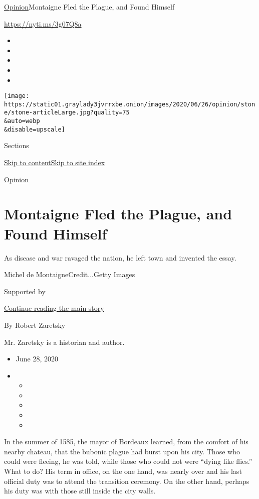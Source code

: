 \href{/section/opinion}{Opinion}\textbar{}Montaigne Fled the Plague, and
Found Himself

\url{https://nyti.ms/3g07Q8a}

\begin{itemize}
\item
\item
\item
\item
\item
\end{itemize}

\texttt{[image: https://static01.graylady3jvrrxbe.onion/images/2020/06/26/opinion/stone/stone-articleLarge.jpg?quality=75\\\&auto=webp\\\&disable=upscale]}

Sections

\protect\hyperlink{site-content}{Skip to
content}\protect\hyperlink{site-index}{Skip to site index}

\href{/section/opinion}{Opinion}

\hypertarget{montaigne-fled-the-plague-and-found-himself}{%
\section{Montaigne Fled the Plague, and Found
Himself}\label{montaigne-fled-the-plague-and-found-himself}}

As disease and war ravaged the nation, he left town and invented the
essay.

Michel de MontaigneCredit...Getty Images

Supported by

\protect\hyperlink{after-sponsor}{Continue reading the main story}

By Robert Zaretsky

Mr. Zaretsky is a historian and author.

\begin{itemize}
\item
  June 28, 2020
\item
  \begin{itemize}
  \item
  \item
  \item
  \item
  \item
  \end{itemize}
\end{itemize}

In the summer of 1585, the mayor of Bordeaux learned, from the comfort
of his nearby chateau, that the bubonic plague had burst upon his city.
Those who could were fleeing, he was told, while those who could not
were ``dying like flies.'' What to do? His term in office, on the one
hand, was nearly over and his last official duty was to attend the
transition ceremony. On the other hand, perhaps his duty was with those
still inside the city walls.

